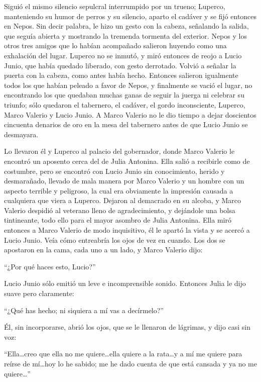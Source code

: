 \documentclass[11pt,openany]{book}
\begin{document}
Siguió el mismo silencio sepulcral interrumpido por un trueno; Luperco, manteniendo su humor de perros y su silencio, aparto el cadáver y se fijó entonces en Nepos. Sin decir palabra, le hizo un gesto con la cabeza, señalando la salida, que seguía abierta y mostrando la tremenda tormenta del exterior. Nepos y los otros tres amigos que lo habían acompañado salieron huyendo como una exhalación del lugar. Luperco no se inmutó, y miró entonces de reojo a Lucio Junio, que había quedado liberado, con gesto derrotado. Volvió a señalar la puerta con la cabeza, como antes había hecho. Entonces salieron igualmente todos los que habían peleado a favor de Nepos, y finalmente se vació el lugar, no encontrando los que quedaban muchas ganas de seguir la juerga ni celebrar su triunfo; sólo quedaron el tabernero, el cadáver, el gordo inconsciente, Luperco, Marco Valerio y Lucio Junio. A Marco Valerio no le dio tiempo a dejar doscientos cincuenta denarios de oro en la mesa del tabernero antes de que Lucio Junio se desmayara. 

Lo llevaron él y Luperco al palacio del gobernador, donde Marco Valerio le encontró un aposento cerca del de Julia Antonina. Ella salió a recibirle como de costumbre, pero se encontró con Lucio Junio sin conocimiento, herido y desmarañado, llevado de mala manera por Marco Valerio y un hombre con un aspecto terrible y peligroso, la cual era obviamente la impresión causada a cualquiera que viera a Luperco. Dejaron al demacrado en su alcoba, y Marco Valerio despidió al veterano lleno de agradecimiento, y dejándole una bolsa tintineante, todo ello para el mayor asombro de Julia Antonina. Ella miró entonces a Marco Valerio de modo inquisitivo, él le apartó la vista y se acercó a Lucio Junio. Veía cómo entreabría los ojos de vez en cuando. Los dos se apostaron en la cama, cada uno a un lado, y Marco Valerio dijo: 

“¿Por qué haces esto, Lucio?” 

Lucio Junio sólo emitió un leve e incomprensible sonido. Entonces Julia le dijo suave pero claramente: 

“¿Qué has hecho; ni siquiera a mí vas a decírmelo?” 

Él, sin incorporarse, abrió los ojos, que se le llenaron de lágrimas, y dijo casi sin voz: 

“Ella\dots creo que ella no me quiere\dots ella quiere a la rata\dots y a mí me quiere para reírse de mí\dots hoy lo he sabido; me he dado cuenta de que está cansada y ya no me quiere\dots” 
\end{document}
